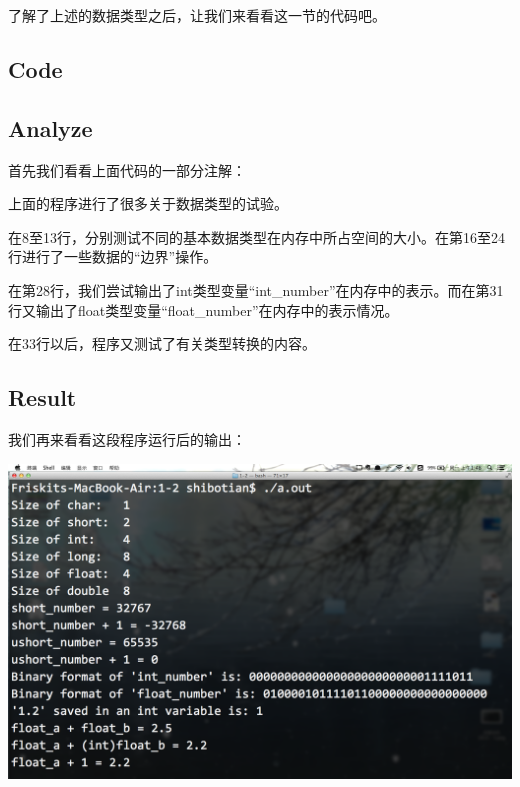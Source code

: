 了解了上述的数据类型之后，让我们来看看这一节的代码吧。

\subsection{Code}



\subsection{Analyze}
首先我们看看上面代码的一部分注解：
\showremarks

上面的程序进行了很多关于数据类型的试验。

在8至13行，分别测试不同的基本数据类型在内存中所占空间的大小。在第16至24行进行了一些数据的“边界”操作。

在第28行，我们尝试输出了int类型变量“int\_number”在内存中的表示。而在第31行又输出了float类型变量“float\_number”在内存中的表示情况。

在33行以后，程序又测试了有关类型转换的内容。

\subsection{Result}
我们再来看看这段程序运行后的输出：
\\[\intextsep] 
  \begin{minipage}{\textwidth} 
    \centering 
    \includegraphics{codes/1-2/result.png}
    \label{fig:code-1-2-result} 
  \end{minipage} 
\\[\intextsep] 

